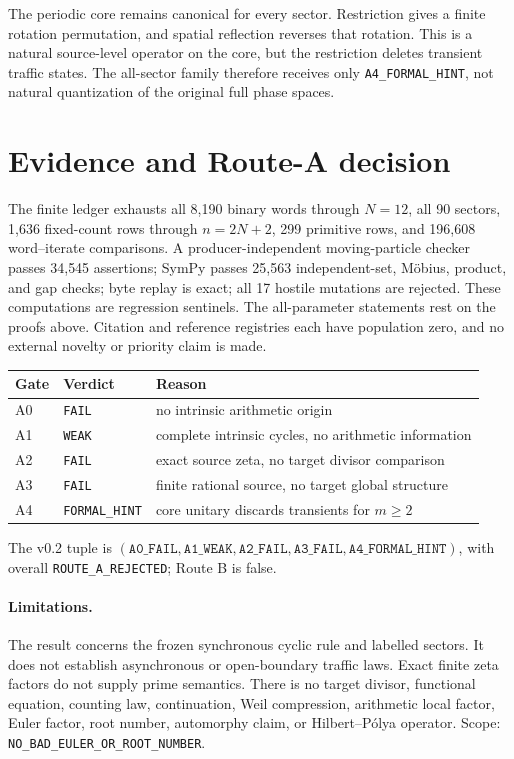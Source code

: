 \documentclass[10pt]{article}
\begin{document}
The periodic core remains canonical for every sector. Restriction gives a
finite rotation permutation, and spatial reflection reverses that rotation.
This is a natural source-level operator on the core, but the restriction
deletes transient traffic states. The all-sector family therefore receives
only \texttt{A4\_FORMAL\_HINT}, not natural quantization of the original full
phase spaces.

\section{Evidence and Route-A decision}
The finite ledger exhausts all 8{,}190 binary words through $N=12$, all 90
sectors, 1{,}636 fixed-count rows through $n=2N+2$, 299 primitive rows, and
196{,}608 word--iterate comparisons. A producer-independent moving-particle
checker passes 34{,}545 assertions; SymPy passes 25{,}563 independent-set,
Möbius, product, and gap checks; byte replay is exact; all 17 hostile
mutations are rejected. These computations are regression sentinels. The
all-parameter statements rest on the proofs above. Citation and reference
registries each have population zero, and no external novelty or priority
claim is made.

\begin{center}
\small
\begin{tabular}{lll}
\toprule
Gate&Verdict&Reason\\
\midrule
A0&\texttt{FAIL}&no intrinsic arithmetic origin\\
A1&\texttt{WEAK}&complete intrinsic cycles, no arithmetic information\\
A2&\texttt{FAIL}&exact source zeta, no target divisor comparison\\
A3&\texttt{FAIL}&finite rational source, no target global structure\\
A4&\texttt{FORMAL\_HINT}&core unitary discards transients for $m\ge2$\\
\bottomrule
\end{tabular}
\end{center}
The v0.2 tuple is
\((\texttt{A0\_FAIL},\texttt{A1\_WEAK},\texttt{A2\_FAIL},
\texttt{A3\_FAIL},\texttt{A4\_FORMAL\_HINT})\), with overall
\texttt{ROUTE\_A\_REJECTED}; Route B is false.

\paragraph{Limitations.}
The result concerns the frozen synchronous cyclic rule and labelled sectors.
It does not establish asynchronous or open-boundary traffic laws. Exact
finite zeta factors do not supply prime semantics. There is no target
divisor, functional equation, counting law, continuation, Weil compression,
arithmetic local factor, Euler factor, root number, automorphy claim, or
Hilbert--P\'olya operator. Scope:
\texttt{NO\_BAD\_EULER\_OR\_ROOT\_NUMBER}.
\end{document}
